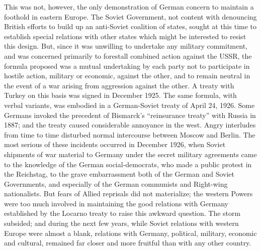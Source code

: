 This was not, however, the only demonstration of German concern to maintain a foothold in eastern Europe. The Soviet Government, not content with denouncing British efforts to build up an anti-Soviet coalition of states, sought at this time to establish special relations with other states which might be interested to resist this design. But, since it was unwilling to undertake any military commitment, and was concerned primarily to forestall combined action against the USSR, the formula proposed was a mutual undertaking by each party not to participate in hostile action, military or economic, against the other, and to remain neutral in the event of a war arising from aggression against the other. A treaty with Turkey on this basis was signed in December 1925. The same formula, with verbal variants, was embodied in a German-Soviet treaty of April 24, 1926. Some Germans invoked the precedent of Bismarck's ``reinsurance treaty'' with Russia in 1887; and the treaty caused considerable annoyance in the west. Angry interludes from time to time disturbed normal intercourse between Moscow and Berlin. The most serious of these incidents occurred in December 1926, when Soviet shipments of war material to Germany under the secret military agreements came to the knowledge of the German social-democrats, who made a public protest in the Reichstag, to the grave embarrassment both of the German and Soviet Governments, and especially of the German communists and Right-wing nationalists. But fears of Allied reprisals did not materialize; the western Powers were too much involved in maintaining the good relations with Germany established by the Locarno treaty to raise this awkward question. The storm subsided; and during the next few years, while Soviet relations with western Europe were almost a blank, relations with Germany, political, military, economic and cultural, remained far closer and more fruitful than with any other country. 

